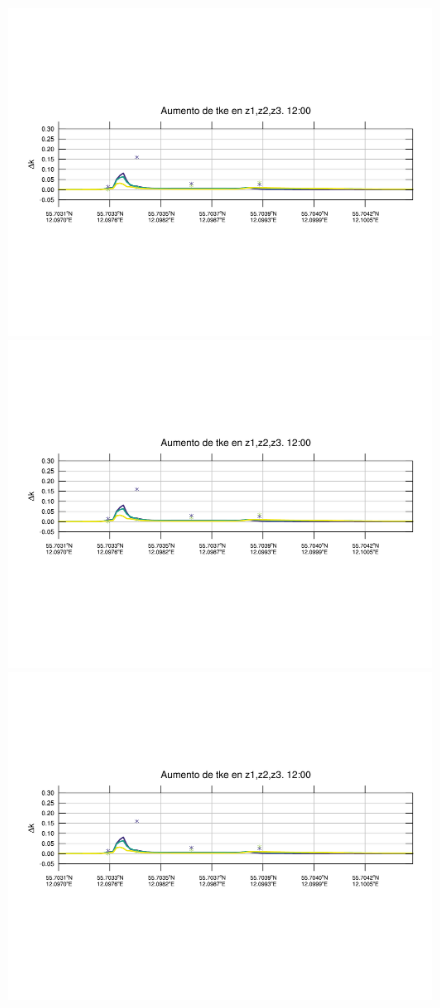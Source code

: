 \begin{figure}[H]
	\centering
	\includegraphics[width=0.90\linewidth,trim={12mm 84mm 10mm 74mm},page=1,clip]{Imagenes/06/bol/delta_tke}\\%
	\includegraphics[width=0.90\linewidth,trim={12mm 84mm 10mm 74mm},page=13,clip]{Imagenes/06/bol/delta_tke}\\%
	\includegraphics[width=0.90\linewidth,trim={12mm 84mm 10mm 74mm},page=25,clip]{Imagenes/06/bol/delta_tke}\\%

\end{figure}
